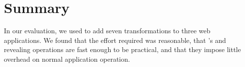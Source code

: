 




%
\section{Summary}
In our evaluation, we used \sys to add seven \xxing transformations to three web
applications. We found that the effort required was reasonable, that \sys's
\xxing and revealing operations are fast enough to be practical, and that they
impose little overhead on normal application operation.
%
